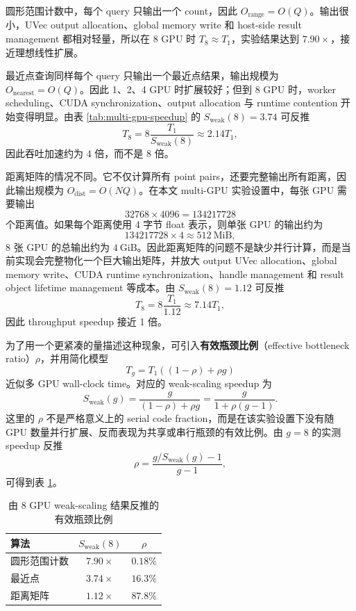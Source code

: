 圆形范围计数中，每个 query 只输出一个 count，因此 \(O_{\mathrm{range}}=O(Q)\)。输出很小，UVec output allocation、global memory write 和 host-side result management 都相对轻量，所以在 8 GPU 时 \(T_8\approx T_1\)，实验结果达到 \(7.90\times\)，接近理想线性扩展。

最近点查询同样每个 query 只输出一个最近点结果，输出规模为 \(O_{\mathrm{nearest}}=O(Q)\)。因此 1、2、4 GPU 时扩展较好；但到 8 GPU 时，worker scheduling、CUDA synchronization、output allocation 与 runtime contention 开始变得明显。由表 \ref{tab:multi-gpu-speedup} 的 \(S_{\mathrm{weak}}(8)=3.74\) 可反推
\[
  T_8
  =
  8\frac{T_1}{S_{\mathrm{weak}}(8)}
  \approx
  2.14T_1,
\]
因此吞吐加速约为 4 倍，而不是 8 倍。

距离矩阵的情况不同。它不仅计算所有 point pairs，还要完整输出所有距离，因此输出规模为 \(O_{\mathrm{dist}}=O(NQ)\)。在本文 multi-GPU 实验设置中，每张 GPU 需要输出
\[
  32768\times 4096 = 134217728
\]
个距离值。如果每个距离使用 4 字节 float 表示，则单张 GPU 的输出约为
\[
  134217728\times 4 \approx 512\ \mathrm{MiB},
\]
8 张 GPU 的总输出约为 \(4\ \mathrm{GiB}\)。因此距离矩阵的问题不是缺少并行计算，而是当前实现会完整物化一个巨大输出矩阵，并放大 output UVec allocation、global memory write、CUDA runtime synchronization、handle management 和 result object lifetime management 等成本。由 \(S_{\mathrm{weak}}(8)=1.12\) 可反推
\[
  T_8
  =
  8\frac{T_1}{1.12}
  \approx
  7.14T_1,
\]
因此 throughput speedup 接近 1 倍。

为了用一个更紧凑的量描述这种现象，可引入\textbf{有效瓶颈比例}（effective bottleneck ratio）\(\rho\)，并用简化模型
\[
  T_g = T_1\left((1-\rho)+\rho g\right)
\]
近似多 GPU wall-clock time。对应的 weak-scaling speedup 为
\[
  S_{\mathrm{weak}}(g)
  =
  \frac{g}{(1-\rho)+\rho g}
  =
  \frac{g}{1+\rho(g-1)}.
\]
这里的 \(\rho\) 不是严格意义上的 serial code fraction，而是在该实验设置下没有随 GPU 数量并行扩展、反而表现为共享或串行瓶颈的有效比例。由 \(g=8\) 的实测 speedup 反推
\[
  \rho
  =
  \frac{g/S_{\mathrm{weak}}(g)-1}{g-1},
\]
可得到表 \ref{tab:effective-bottleneck-ratio}。

\begin{table}[H]
\centering
\caption{由 8 GPU weak-scaling 结果反推的有效瓶颈比例}
\label{tab:effective-bottleneck-ratio}
\begin{tabular}{lcc}
\toprule
算法 & \(S_{\mathrm{weak}}(8)\) & \(\rho\) \\
\midrule
圆形范围计数 & \(7.90\times\) & \(0.18\%\) \\
最近点 & \(3.74\times\) & \(16.3\%\) \\
距离矩阵 & \(1.12\times\) & \(87.8\%\) \\
\bottomrule
\end{tabular}
\end{table}

